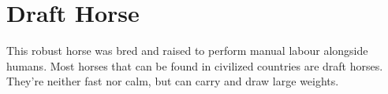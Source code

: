 \section{Draft Horse}

This robust horse was bred and raised to perform manual labour alongside humans. Most horses that can be found in civilized countries are draft horses. They're neither fast nor calm, but can carry and draw large weights.